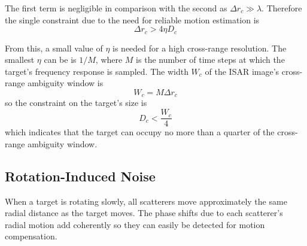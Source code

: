 The first term is negligible in comparison with the second as $\Delta r_c\gg
\lambda$.  Therefore the single constraint due to the need for reliable
motion estimation is
\begin{equation}
\Delta r_c>4\eta D_c
\end{equation}

From this, a small value of $\eta$ is needed for a high cross-range
resolution.  The smallest $\eta$ can be is $1/M$, where $M$ is the number of
time steps at which the target's frequency response is sampled.
The width $W_c$ of the ISAR image's cross-range ambiguity window is 
\begin{equation}
W_c=M\Delta r_c
\end{equation}
so the constraint on the target's size is
\begin{equation}
D_c<\frac{W_c}{4}
\end{equation}
which indicates that the target can occupy no more than a quarter of the
cross-range ambiguity window.

\subsection{Rotation-Induced Noise}

When a target is rotating slowly, all scatterers move approximately the same
radial distance as the target moves.  The phase shifts due to each
scatterer's radial motion add coherently so they can easily be detected for 
motion compensation.

